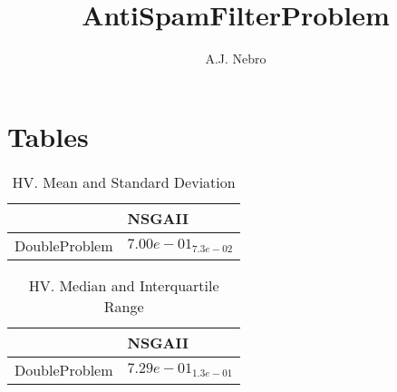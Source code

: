 \documentclass{article}
\title{AntiSpamFilterProblem}
\author{A.J. Nebro}
\begin{document}
\maketitle
\section{Tables}

\begin{table}
\caption{HV. Mean and Standard Deviation}
\label{table: HV}
\centering
\begin{scriptsize}
\begin{tabular}{ll}
\hline &  NSGAII\\
\hline 
DoubleProblem & \cellcolor{gray95}$  7.00e-01_{ 7.3e-02}$ \\
\hline
\end{tabular}
\end{scriptsize}
\end{table}

\begin{table}
\caption{HV. Median and Interquartile Range}
\label{table: HV}
\centering
\begin{scriptsize}
\begin{tabular}{ll}
\hline &  NSGAII\\
\hline 
DoubleProblem & \cellcolor{gray95}$  7.29e-01_{ 1.3e-01}$ \\
\hline
\end{tabular}
\end{scriptsize}
\end{table}
\end{document}
